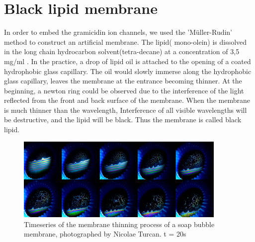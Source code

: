 \documentclass[a4paper,english,12pt,bibliography=totoc]{scrreprt}
\begin{document}
\section{Black lipid membrane}
In order to embed the gramicidin ion channels, we used the 'M\"uller-Rudin' method to construct an artificial membrane. The lipid( mono-olein) is dissolved in the long chain hydrocarbon solvent(tetra-decane) at a concentration of 3,5 mg/ml . In the practice, a drop of lipid oil is attached to the opening of a coated hydrophobic glass capillary. The oil would slowly immerse along the hydrophobic glass capillary, leaves the membrane at the entrance becoming thinner. At the beginning, a newton ring could be observed due to the interference of the light reflected from the front and back surface of the membrane. When the membrane is much thinner than the wavelength, Interference of all visible wavelengths will be destructive, and the lipid will be black. Thus the membrane is called black lipid.
\begin{figure}[H]
    \centering
    \includegraphics[width = 0.9\textwidth]{Group 8/Black Bubble Membrane.jpg}
    \caption{Timeseries of the membrane thinning process of a soap bubble membrane, photographed by Nicolae Turcan. t = 20s}
    \label{fig:enter-label}
\end{figure}
\end{document}

